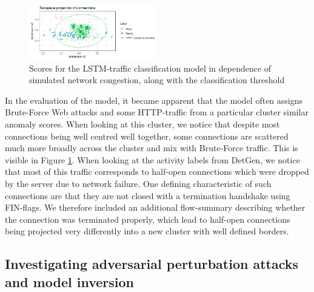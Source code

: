\documentclass[sigconf]{acmart}
\begin{document}
\begin{figure}
\centering
\includegraphics[width=0.5\textwidth]{images/Subspace_projection.png}
\caption{Scores for the LSTM-traffic classification model in dependence of simulated network congestion, along with the classification threshold}\label{fig:Subspace_projection}
\end{figure}

In the evaluation of the model, it became apparent that the model often assigns Brute-Force Web attacks and some HTTP-traffic from a particular cluster similar anomaly scores. When looking at this cluster, we notice that despite most connections being well centred well together, some 
connections are scattered much more broadly across the cluster and mix with Brute-Force traffic.
This is visible in Figure \ref{fig:Subspace_projection}. When looking at the activity labels from DetGen, we notice that most of this traffic corresponds to half-open connections which were dropped by the server due to network failure. One defining characteristic of such connections are that they are not closed with a termination handshake using FIN-flags. We therefore included an additional flow-summary describing whether the connection was terminated properly, which lead to half-open connections being projected very differently into a new cluster with well defined borders.


\subsection{Investigating adversarial perturbation attacks and model inversion}
\end{document}
